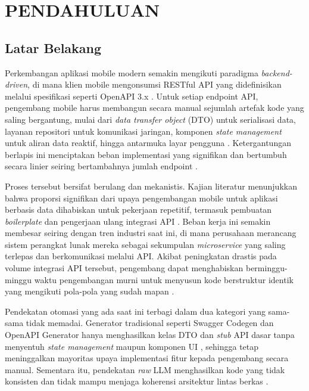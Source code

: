 \chapter{PENDAHULUAN}

\section{Latar Belakang}

Perkembangan aplikasi mobile modern semakin mengikuti paradigma \textit{backend-driven}, di mana klien mobile mengonsumsi RESTful API yang didefinisikan melalui spesifikasi seperti OpenAPI 3.x \cite{baneas2021}. Untuk setiap endpoint API, pengembang mobile harus membangun secara manual sejumlah artefak kode yang saling bergantung, mulai dari \textit{data transfer object} (DTO) untuk serialisasi data, layanan repositori untuk komunikasi jaringan, komponen \textit{state management} untuk aliran data reaktif, hingga antarmuka layar pengguna \cite{lamothe2021}. Ketergantungan berlapis ini menciptakan beban implementasi yang signifikan dan bertumbuh secara linier seiring bertambahnya jumlah endpoint \cite{zhang2021}.

Proses tersebut bersifat berulang dan mekanistis. Kajian literatur menunjukkan bahwa proporsi signifikan dari upaya pengembangan mobile untuk aplikasi berbasis data dihabiskan untuk pekerjaan repetitif, termasuk pembuatan \textit{boilerplate} dan pengerjaan ulang integrasi API \cite{khalfaoui2025}. Beban kerja ini semakin membesar seiring dengan tren industri saat ini, di mana perusahaan merancang sistem perangkat lunak mereka sebagai sekumpulan \textit{microservice} yang saling terlepas dan berkomunikasi melalui API. Akibat peningkatan drastis pada volume integrasi API tersebut, pengembang dapat menghabiskan berminggu-minggu waktu pengembangan murni untuk menyusun kode berstruktur identik yang mengikuti pola-pola yang sudah mapan \cite{lercher2024}.

Pendekatan otomasi yang ada saat ini terbagi dalam dua kategori yang sama-sama tidak memadai. Generator tradisional seperti Swagger Codegen dan OpenAPI Generator hanya menghasilkan kelas DTO dan \textit{stub} API dasar tanpa menyentuh \textit{state management} maupun komponen UI \cite{openapitools2026}, sehingga tetap meninggalkan mayoritas upaya implementasi fitur kepada pengembang secara manual. Sementara itu, pendekatan \textit{raw} LLM menghasilkan kode yang tidak konsisten dan tidak mampu menjaga koherensi arsitektur lintas berkas \cite{ying2025}.

